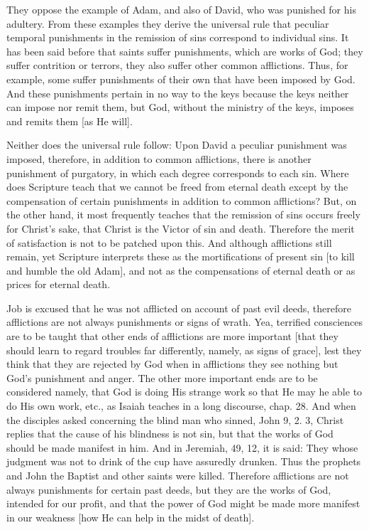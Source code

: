 They oppose the example of Adam, and also of David, who was punished
for his adultery.  From these examples they derive the universal rule
that peculiar temporal punishments in the remission of sins
correspond to individual sins.  It has been said before that saints
suffer punishments, which are works of God; they suffer contrition or
terrors, they also suffer other common afflictions.  Thus, for
example, some suffer punishments of their own that have been imposed
by God.  And these punishments pertain in no way to the keys because
the keys neither can impose nor remit them, but God, without the
ministry of the keys, imposes and remits them [as He will].

Neither does the universal rule follow: Upon David a peculiar
punishment was imposed, therefore, in addition to common afflictions,
there is another punishment of purgatory, in which each degree
corresponds to each sin.  Where does Scripture teach that we cannot
be freed from eternal death except by the compensation of certain
punishments in addition to common afflictions?  But, on the other
hand, it most frequently teaches that the remission of sins occurs
freely for Christ's sake, that Christ is the Victor of sin and death.
Therefore the merit of satisfaction is not to be patched upon this.
And although afflictions still remain, yet Scripture interprets these
as the mortifications of present sin [to kill and humble the old
Adam], and not as the compensations of eternal death or as prices for
eternal death.

Job is excused that he was not afflicted on account of past evil
deeds, therefore afflictions are not always punishments or signs of
wrath.  Yea, terrified consciences are to be taught that other ends
of afflictions are more important [that they should learn to regard
troubles far differently, namely, as signs of grace], lest they think
that they are rejected by God when in afflictions they see nothing
but God's punishment and anger.  The other more important ends are to
be considered namely, that God is doing His strange work so that He
may he able to do His own work, etc., as Isaiah teaches in a long
discourse, chap. 28. And when the disciples asked concerning the
blind man who sinned, John 9, 2. 3, Christ replies that the cause of
his blindness is not sin, but that the works of God should be made
manifest in him.  And in Jeremiah, 49, 12, it is said: They whose
judgment was not to drink of the cup have assuredly drunken.  Thus
the prophets and John the Baptist and other saints were killed.
Therefore afflictions are not always punishments for certain past
deeds, but they are the works of God, intended for our profit, and
that the power of God might be made more manifest in our weakness
[how He can help in the midst of death].


